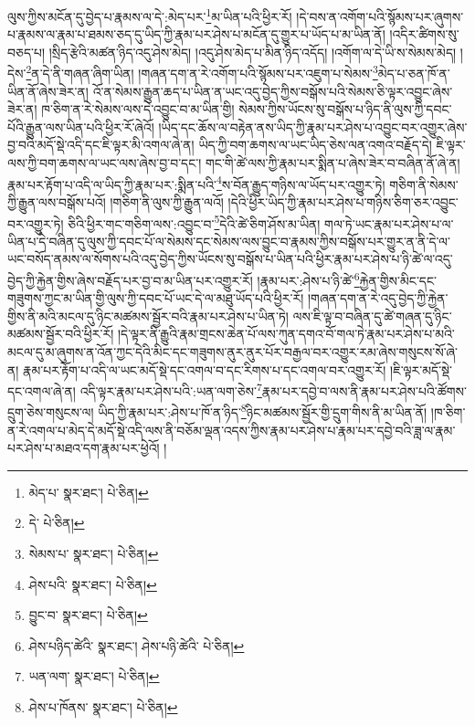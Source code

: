 ལུས་ཀྱིས་མངོན་དུ་བྱེད་པ་རྣམས་ལ་དེ་:མེད་པར་\footnote{མེད་པ་  སྣར་ཐང་།  པེ་ཅིན། }མ་ཡིན་པའི་ཕྱིར་རོ། །དེ་བས་ན་འགོག་པའི་སྙོམས་པར་ཞུགས་པ་རྣམས་ལ་རྣམ་པ་ཐམས་ཅད་དུ་ཡིད་ཀྱི་རྣམ་པར་ཤེས་པ་མངོན་དུ་གྱུར་པ་ཡོད་པ་མ་ཡིན་ནོ། །འདིར་ཚིགས་སུ་བཅད་པ། །སྲིད་རྩེའི་མཚན་ཉིད་འདུ་ཤེས་མེད། །འདུ་ཤེས་མེད་པ་མིན་ཉིད་འདོད། །འགོག་ལ་དེ་ཡི་ས་སེམས་མེད། །དེས་\footnote{དེ་  པེ་ཅིན། }ན་དེ་ནི་གཞན་ཞིག་ཡིན། །གཞན་དག་ན་རེ་འགོག་པའི་སྙོམས་པར་འཇུག་པ་སེམས་\footnote{སེམས་པ་  སྣར་ཐང་།  པེ་ཅིན། }མེད་པ་ཅན་ཁོ་ན་ཡིན་ནོ་ཞེས་ཟེར་ན། འོ་ན་སེམས་རྒྱུན་ཆད་པ་ཡིན་ན་ཡང་འདུ་བྱེད་ཀྱིས་བསྒོས་པའི་སེམས་ཅི་ལྟར་འབྱུང་ཞེས་ཟེར་ན། ཁ་ཅིག་ན་རེ་སེམས་ལས་དེ་འབྱུང་བ་མ་ཡིན་གྱི། སེམས་ཀྱིས་ཡོངས་སུ་བསྒོས་པ་ཉིད་ནི་ལུས་ཀྱི་དབང་པོའི་རྒྱུན་ལས་ཡིན་པའི་ཕྱིར་རོ་ཞེའོ། །ཡིད་དང་ཆོས་ལ་བརྟེན་ནས་ཡིད་ཀྱི་རྣམ་པར་ཤེས་པ་འབྱུང་བར་འགྱུར་ཞེས་བྱ་བའི་མདོ་སྡེ་འདི་དང་ཇི་ལྟར་མི་འགལ་ཞེ་ན། ཡིད་ཀྱི་བག་ཆགས་ལ་ཡང་ཡིད་ཅེས་ལན་འགའ་བརྗོད་དེ། ཇི་ལྟར་ལས་ཀྱི་བག་ཆགས་ལ་ཡང་ལས་ཞེས་བྱ་བ་དང་། གང་གི་ཚེ་ལས་ཀྱི་རྣམ་པར་སྨིན་པ་ཞེས་ཟེར་བ་བཞིན་ནོ་ཞེ་ན། རྣམ་པར་རྟོག་པ་འདི་ལ་ཡིད་ཀྱི་རྣམ་པར་:སྨིན་པའི་\footnote{ཤེས་པའི་  སྣར་ཐང་།  པེ་ཅིན། }ས་བོན་རྒྱུད་གཉིས་ལ་ཡོད་པར་འགྱུར་ཏེ། གཅིག་ནི་སེམས་ཀྱི་རྒྱུན་ལས་བསྒོས་པའོ། །གཅིག་ནི་ལུས་ཀྱི་རྒྱུན་ལའོ། །དེའི་ཕྱིར་ཡིད་ཀྱི་རྣམ་པར་ཤེས་པ་གཉིས་ཅིག་ཅར་འབྱུང་བར་འགྱུར་ཏེ། ཅིའི་ཕྱིར་གང་གཅིག་ལས་:འབྱུང་བ་\footnote{བྱུང་བ་  སྣར་ཐང་།  པེ་ཅིན། }དེའི་ཚེ་ཅིག་ཤོས་མ་ཡིན། གལ་ཏེ་ཡང་རྣམ་པར་ཤེས་པ་ལ་ཡིན་པ་དེ་བཞིན་དུ་ལུས་ཀྱི་དབང་པོ་ལ་སེམས་དང་སེམས་ལས་བྱུང་བ་རྣམས་ཀྱིས་བསྒོས་པར་གྱུར་ན་ནི་དེ་ལ་ཡང་བསོད་ནམས་ལ་སོགས་པའི་འདུ་བྱེད་ཀྱིས་ཡོངས་སུ་བསྒོས་པ་ཡིན་པའི་ཕྱིར་རྣམ་པར་ཤེས་པ་ཉི་ཚེ་ལ་འདུ་བྱེད་ཀྱི་རྐྱེན་གྱིས་ཞེས་བརྗོད་པར་བྱ་བ་མ་ཡིན་པར་འགྱུར་རོ། །རྣམ་པར་:ཤེས་པ་ཉི་ཚེ་\footnote{ཤེས་པཉིད་ཚེའི་  སྣར་ཐང་། ཤེས་པཉི་ཚེའི་  པེ་ཅིན། }རྐྱེན་གྱིས་མིང་དང་གཟུགས་ཀྱང་མ་ཡིན་གྱི་ལུས་ཀྱི་དབང་པོ་ཡང་དེ་ལ་མཐུ་ཡོད་པའི་ཕྱིར་རོ། །གཞན་དག་ན་རེ་འདུ་བྱེད་ཀྱི་རྐྱེན་གྱིས་ནི་མའི་མངལ་དུ་ཉིང་མཚམས་སྦྱོར་བའི་རྣམ་པར་ཤེས་པ་ཡིན་ཏེ། ལས་ཇི་ལྟ་བ་བཞིན་དུ་ཚེ་གཞན་དུ་ཉིང་མཚམས་སྦྱོར་བའི་ཕྱིར་རོ། །དེ་ལྟར་ནི་རྒྱུའི་རྣམ་གྲངས་ཆེན་པོ་ལས་ཀུན་དགའ་བོ་གལ་ཏེ་རྣམ་པར་ཤེས་པ་མའི་མངལ་དུ་མ་ཞུགས་ན་འོན་ཀྱང་དེའི་མིང་དང་གཟུགས་ནུར་ནུར་པོར་བརྒྱལ་བར་འགྱུར་རམ་ཞེས་གསུངས་སོ་ཞེ་ན། རྣམ་པར་རྟོག་པ་འདི་ལ་ཡང་མདོ་སྡེ་དང་འགལ་བ་དང་རིགས་པ་དང་འགལ་བར་འགྱུར་རོ། །ཇི་ལྟར་མདོ་སྡེ་དང་འགལ་ཞེ་ན། འདི་ལྟར་རྣམ་པར་ཤེས་པའི་:ཡན་ལག་ཅེས་\footnote{ཡན་ལག་  སྣར་ཐང་།  པེ་ཅིན། }རྣམ་པར་དབྱེ་བ་ལས་ནི་རྣམ་པར་ཤེས་པའི་ཚོགས་དྲུག་ཅེས་གསུངས་ལ། ཡིད་ཀྱི་རྣམ་པར་:ཤེས་པ་ཁོ་ན་ཉིད་\footnote{ཤེས་པ་ཁོནས་  སྣར་ཐང་།  པེ་ཅིན། }ཉིང་མཚམས་སྦྱོར་གྱི་དྲུག་གིས་ནི་མ་ཡིན་ནོ། །ཁ་ཅིག་ན་རེ་འགལ་པ་མེད་དེ་མདོ་སྡེ་འདི་ལས་ནི་བཅོམ་ལྡན་འདས་ཀྱིས་རྣམ་པར་ཤེས་པ་རྣམ་པར་དབྱེ་བའི་ཟླ་ལ་རྣམ་པར་ཤེས་པ་མཐའ་དག་རྣམ་པར་ཕྱེའོ། །
